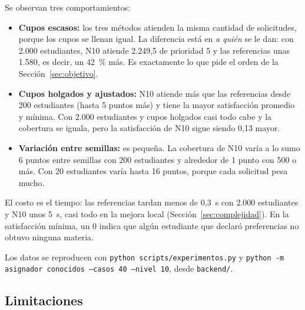 Se observan tres comportamientos:
\begin{itemize}
\item \textbf{Cupos escasos:} los tres métodos atienden la misma cantidad de solicitudes, porque los cupos se llenan igual. La diferencia está en \emph{a quién} se le dan: con 2.000 estudiantes, N10 atiende 2.249,5 de prioridad 5 y las referencias unas 1.580, es decir, un 42~\% más. Es exactamente lo que pide el orden de la Sección~\ref{sec:objetivo}.
\item \textbf{Cupos holgados y ajustados:} N10 atiende más que las referencias desde 200 estudiantes (hasta 5 puntos más) y tiene la mayor satisfacción promedio y mínima. Con 2.000 estudiantes y cupos holgados casi todo cabe y la cobertura se iguala, pero la satisfacción de N10 sigue siendo 0,13 mayor.
\item \textbf{Variación entre semillas:} es pequeña. La cobertura de N10 varía a lo sumo 6 puntos entre semillas con 200 estudiantes y alrededor de 1 punto con 500 o más. Con 20 estudiantes varía hasta 16 puntos, porque cada solicitud pesa mucho.
\end{itemize}
El costo es el tiempo: las referencias tardan menos de 0,3~s con 2.000 estudiantes y N10 unos 5~s, casi todo en la mejora local (Sección~\ref{sec:complejidad}). En la satisfacción mínima, un 0 indica que algún estudiante que declaró preferencias no obtuvo ninguna materia.

Los datos se reproducen con \texttt{python scripts/experimentos.py} y \texttt{python -m asignador conocidos --casos 40 --nivel 10}, desde \texttt{backend/}.

\subsection{Limitaciones}\label{sec:limitaciones}

